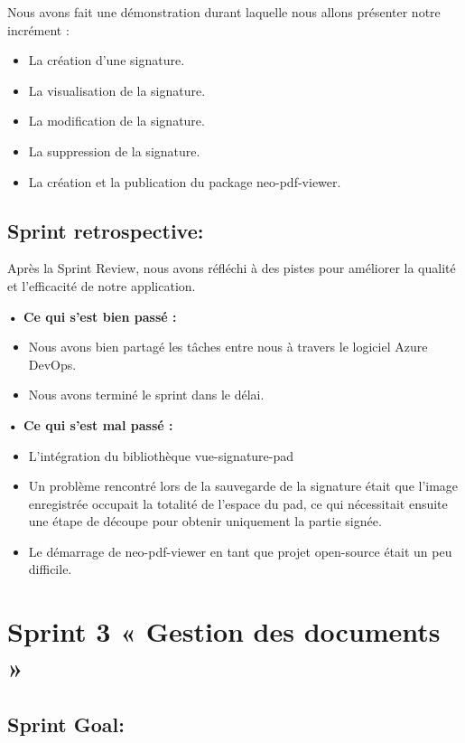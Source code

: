 Nous avons fait une démonstration durant laquelle nous allons présenter notre incrément :

\begin{itemize}
  \item La création d'une signature.
  \item La visualisation de la signature.
  \item La modification de la signature.
  \item La suppression de la signature.
  \item La création et la publication du package neo-pdf-viewer.
\end{itemize}

\subsection{Sprint retrospective:}

Après la Sprint Review, nous avons réfléchi à des pistes pour améliorer la qualité et l'efficacité de notre application.

\noindent\textbf{•	Ce qui s'est bien passé :}
\begin{itemize}
  \item Nous avons bien partagé les tâches entre nous à travers le logiciel Azure DevOps. 
  \item Nous avons terminé le sprint dans le délai.
\end{itemize}

\noindent\textbf{•	Ce qui s'est mal passé :}
\begin{itemize}
  \item L'intégration du bibliothèque vue-signature-pad
  \item Un problème rencontré lors de la sauvegarde de la signature était que l'image enregistrée occupait la totalité de l'espace du pad, ce qui nécessitait ensuite une étape de découpe pour obtenir uniquement la partie signée.
  \item Le démarrage de neo-pdf-viewer en tant que projet open-source était un peu difficile.
\end{itemize}

\section{Sprint 3 « Gestion des documents »}
\subsection{Sprint Goal:}

